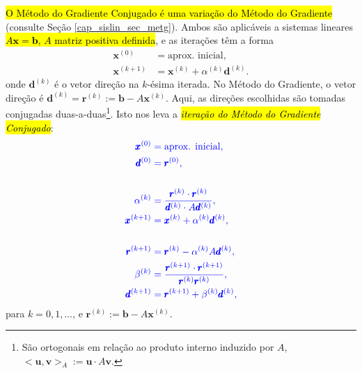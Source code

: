 \hl{O Método do Gradiente Conjugado é uma variação do Método do Gradiente} (consulte Seção \ref{cap_sislin_sec_metg}). Ambos são aplicáveis a sistemas lineares \hl{$A\pmb{x} = \pmb{b}$, $A$ matriz positiva definida}, e as iterações têm a forma
\begin{align}
  \pmb{x}^{(0)} &= \text{aprox. inicial},\\
  \pmb{x}^{(k+1)} &= \pmb{x}^{(k)} + \alpha^{(k)}\pmb{d}^{(k)}.
\end{align}
onde $\pmb{d}^{(k)}$ é o vetor direção na $k$-ésima iterada. No Método do Gradiente, o vetor direção é $\pmb{d}^{(k)} = \pmb{r}^{(k)}:= \pmb{b} - A\pmb{x}^{(k)}$. Aqui, as direções escolhidas são tomadas conjugadas duas-a-duas\footnote{São ortogonais em relação ao produto interno induzido por $A$, $<\pmb{u}, \pmb{v}>_A := \pmb{u}\cdot A\pmb{v}$.}. Isto nos leva a \hl{\emph{iteração do Método do Gradiente Conjugado}}:
\begin{align}
  \color{blue}\pmb{x}^{(0)} &\color{blue}= \text{aprox. inicial},\\
  \color{blue}\pmb{d}^{(0)} &\color{blue}= \pmb{r}^{(0)},\\
  &\nonumber\\
  \color{blue}\alpha^{(k)} &\color{blue}= \frac{\pmb{r}^{(k)}\cdot \pmb{r}^{(k)}}{\pmb{d}^{(k)}\cdot A\pmb{d}^{(k)}},\\
  \color{blue}\pmb{x}^{(k+1)} &\color{blue}= \pmb{x}^{(k)} + \alpha^{(k)}\pmb{d}^{(k)},\\
  &\nonumber\\
  \color{blue}\pmb{r}^{(k+1)} &\color{blue}= \pmb{r}^{(k)} - \alpha^{(k)}A\pmb{d}^{(k)},\\
  \color{blue}\beta^{(k)} &\color{blue}= \frac{\pmb{r}^{(k+1)}\cdot \pmb{r}^{(k+1)}}{\pmb{r}^{(k)}\pmb{r}^{(k)}},\\
  \color{blue}\pmb{d}^{(k+1)} &\color{blue}= \pmb{r}^{(k+1)}+\beta^{(k)}\pmb{d}^{(k)},\\
\end{align}
para $k = 0, 1, \ldots$, e $\pmb{r}^{(k)} := \pmb{b} - A\pmb{x}^{(k)}$.

